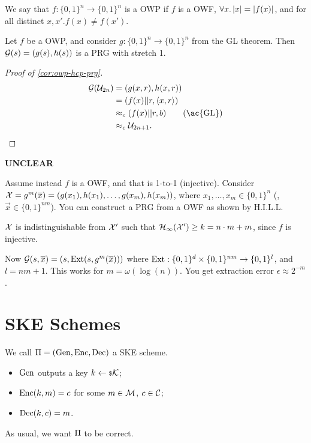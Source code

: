 We say that $f : \{0,1\}^n \to \{0,1\}^{n}$ is a \ac{OWP} if $f$ is a \ac{OWF}, $\forall x . \left|{x}\right| = \left|{f(x)}\right|$, and for all distinct $x, x' . f(x) \neq f(x')$.

\begin{corollary} \label{cor:owp-hcp-prg}
	Let $f$ be a \ac{OWP}, and consider $g : \{0,1\}^n \to \{0,1\}^{n}$ from the \ac{GL} theorem.
	Then $\mathcal{G}(s) = (g(s), h(s))$ is a \ac{PRG} with stretch 1.
\end{corollary}

\begin{proof}[Proof of \cref{cor:owp-hcp-prg}]
	\begin{align*}
		\G(\U_{2n})
		& =
		(g(x,r), h(x,r)) \\
		& =
		(f(x) || r, \DotProduct{x}{r}) \\
		& \CompInd 
		(f(x) || r, b) \tag{\ac{GL}}
		\\
		& \CompInd
		\U_{2n+1}.
	\end{align*}
\end{proof}


\begin{framed}
{\bfseries UNCLEAR}

Assume instead $f$ is a \ac{OWF}, and that is 1-to-1 (injective).
Consider $\mathcal{X} = g^m(\overline{x}) = (g(x_1), h(x_1), \dots, g(x_m), h(x_m))$, where $x_1, \dots, x_m \in \{0,1\}^{n}$ (\ie, $\vec{x} \in \{0,1\}^{nm}$).
You can construct a \ac{PRG} from a \ac{OWF} as shown by H.I.L.L.

\begin{fact}
$\mathcal{X}$ is indistinguishable from $\mathcal{X}'$ such that $\mathcal{H}_{\infty}(\mathcal{X}') \ge k = n \cdot m + m$, since $f$ is injective.
\end{fact}

Now $\mathcal{G}(s, \overline{x}) = (s, \mathrm{Ext}(s, g^{m}(\overline{x})))$ where $\mathrm{Ext} : \{0,1\}^{d} \times \{0,1\}^{nm} \to \{0,1\}^{l}$, and $l = nm + 1$.
This works for $m = \omega(\log(n))$.
You get extraction error $\epsilon \approx 2^{-m}$.
\end{framed}

\section{\acl{SKE} Schemes}

We call $\Pi = \left( \mathrm{Gen} , \allowbreak \mathrm{Enc} , \allowbreak \mathrm{Dec} \right)$ a \ac{SKE} scheme.
\begin{itemize}
	\item $\mathrm{Gen}$ outputs a key $k \leftarrow {\scriptstyle \$} {\mathcal{K}}$;
	\item $\mathrm{Enc}(k, m) = c$ for some $m \in \mathcal{M}$, $c \in \mathcal{C}$;
	\item $\mathrm{Dec}(k, c) = m$.
\end{itemize}
As usual, we want $\Pi$ to be correct.

